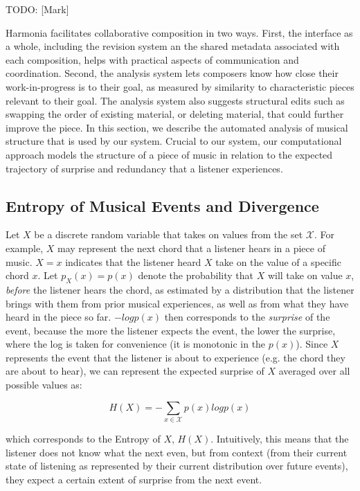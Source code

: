 \documentclass[final,authoryear,11pt,times]{elsarticle}
\begin{document}
TODO: [Mark]

Harmonia facilitates collaborative composition in two ways. First, the interface as a whole, including the revision system an the shared metadata associated with each composition, helps with practical aspects of communication and coordination. Second, the analysis system lets composers know how close their work-in-progress is to their goal, as measured by similarity to characteristic pieces relevant to their goal. The analysis system also suggests structural edits such as swapping the order of existing material, or deleting material, that could further improve the piece. In this section, we describe the automated analysis of musical structure that is used by our system. Crucial to our system, our computational approach models the structure of a piece of music in relation to the expected trajectory of surprise and redundancy that a listener experiences.


 \subsection{Entropy of Musical Events and Divergence}
 
Let $X$ be a discrete random variable that takes on values from the set $\mathcal{X}$. For example, $X$ may represent the next chord that a listener hears in a piece of music. $X=x$ indicates that the listener heard $X$ take on the value of a specific chord $x$. Let $p_X(x) = p(x)$ denote the probability that $X$ will take on value $x$, \textit{before} the listener hears the chord, as estimated by a distribution that the listener brings with them from prior musical experiences, as well as from what they have heard in the piece so far. $-logp(x)$ then corresponds to the \textit{surprise} of the event, because the more the listener expects the event, the lower the surprise, where the log is taken for convenience (it is monotonic in the $p(x)$). Since $X$ represents the event that the listener is about to experience (e.g. the chord they are about to hear), we can represent the expected surprise of $X$ averaged over all possible values as:
 
 $$ H(X) = - \sum_{x \in \mathcal{X}} p(x) logp(x)$$
 
\noindent which corresponds to the Entropy of $X$, $H(X)$. Intuitively, this means that the listener does not know what the next even, but from context (from their current state of listening as represented by their current distribution over future events), they expect a certain extent of surprise from the next event.
\end{document}
